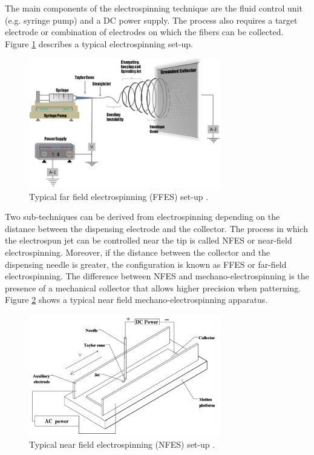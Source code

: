 The main components of the electrospinning technique are the fluid control unit (e.g. syringe pump) and a DC power supply. The process also requires a target electrode or combination of electrodes on which the fibers can be collected. Figure \ref{fig:FFES} describes a typical electrospinning set-up. \cite{Li2012}

\begin{figure}[th]
\centering
\includegraphics[width=0.75\textwidth]{./Figures/FFES.png}
\decoRule
\caption[Far Field Electrospinning set-up]{Typical far field electrospinning (FFES) set-up \cite{Li2012}.}
\label{fig:FFES}
\end{figure}

Two sub-techniques can be derived from electrospinning depending on the distance between the dispensing electrode and the collector. The process in which the electrospun jet can be controlled near the tip is called NFES or near-field electrospinning. \cite{Cisquella-Serra2019} Moreover, if the distance between the collector and the dispensing needle is greater, the configuration is known as FFES or far-field electrospinning. \cite{Nataraj2012} The difference between NFES and mechano-electrospinning is the presence of a mechanical collector that allows higher precision when patterning. Figure \ref{fig:NFES} shows a typical near field mechano-electrospinning apparatus.

\begin{figure}[th]
\centering
\includegraphics[width=0.75\textwidth]{./Figures/NFES.png}
\decoRule
\caption[Near Field Electrospinning set-up]{Typical near field electrospinning (NFES) set-up \cite{Zhu2016}.}
\label{fig:NFES}
\end{figure}

